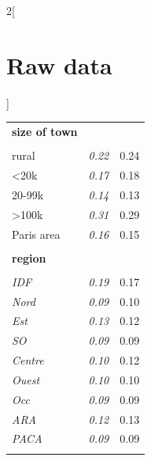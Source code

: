\documentclass[11pt]{article}
\begin{document}
\begin{appendices}
\begin{multicols}{2}[\section{Raw data\label{sec:Raw-Data}}]
\begin{table}[H]
\begin{tabular}{lcc}
\textbf{size of town} &  & \tabularnewline  \\[-1.8ex]
rural & \emph{0.22} & 0.24\tabularnewline
<20k & \emph{0.17} & 0.18\tabularnewline
20-99k & \emph{0.14} & 0.13\tabularnewline
>100k & \emph{0.31} & 0.29\tabularnewline
Paris area & \emph{0.16} & 0.15\tabularnewline
\hline  \\[-1.8ex]
\textbf{region} &  & \tabularnewline  \\[-1.8ex]
\emph{IDF} & \emph{0.19} & 0.17\tabularnewline
 \emph{Nord} & \emph{0.09} & 0.10\tabularnewline
 \emph{Est} & \emph{0.13} & 0.12\tabularnewline
\emph{SO} & \emph{0.09} & 0.09\tabularnewline
\emph{Centre} & \emph{0.10} & 0.12\tabularnewline
 \emph{Ouest} & \emph{0.10} & 0.10\tabularnewline
 \emph{Occ} & \emph{0.09} & 0.09\tabularnewline
\emph{ARA} & \emph{0.12} & 0.13\tabularnewline
\emph{PACA} & \emph{0.09} & 0.09\tabularnewline  \\[-1.8ex]
\hline \hline 
\end{tabular}\bigskip{}
\end{table}



\end{multicols}
\end{appendices}
\end{document}
